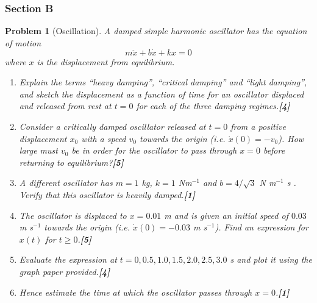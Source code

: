 \documentclass[a4paper]{article}
\theoremstyle{new}
\newtheorem{qns}{Problem}[subsection]
\begin{document}
\subsubsection{Section B}
\begin{qns}[Oscillation]
A damped simple harmonic oscillator has the equation of motion
$$m\ddot{x}+b\dot{x}+kx=0$$
where $x$ is the displacement from equilibrium.
\begin{enumerate}[label=(\roman*)]
\item Explain the terms “heavy damping”, “critical damping” and “light damping”, and sketch the displacement as a function of time for an oscillator displaced and released from rest at $t = 0$ for each of the three damping regimes.\hfill\textbf{[4]}
\item Consider a critically damped oscillator released at $t = 0$ from a positive displacement $x_0$ with a speed $v_0$ towards the origin (i.e. $\dot{x}(0)=-v_0$). How large must $v_0$ be in order for the oscillator to pass through $x = 0$ before returning to equilibrium?\hfill\textbf{[5]}
\item A different oscillator has $m = 1$ kg, $k = 1$ Nm$^{-1}$ and $b = 4/\sqrt{3}$ N m$^{-1}$ s . Verify that this oscillator is heavily damped.\hfill\textbf{[1]}
\item The oscillator is displaced to $x=0.01$ m and is given an initial speed of $0.03$ m s$^{-1}$ towards the origin (i.e. $\dot{x}(0)=-0.03$ m s$^{-1}$). Find an expression for $x(t)$ for $t\geq0$.\hfill\textbf{[5]}
\item Evaluate the expression at $t = 0, 0.5, 1.0,1.5, 2.0, 2.5, 3.0$ s and plot it using the graph paper provided.\hfill\textbf{[4]}
\item Hence estimate the time at which the oscillator passes through $x = 0$.\hfill\textbf{[1]}
\end{enumerate}
\end{qns}
\end{document}
